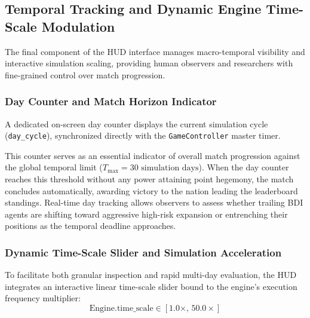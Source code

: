 \subsection{Temporal Tracking and Dynamic Engine Time-Scale Modulation}
\label{subsec:hud_time_controls}

The final component of the HUD interface manages macro-temporal visibility and interactive simulation scaling, providing human observers and researchers with fine-grained control over match progression.

\subsubsection{Day Counter and Match Horizon Indicator}
A dedicated on-screen day counter displays the current simulation cycle (\texttt{day\_cycle}), synchronized directly with the \texttt{GameController} master timer. 

This counter serves as an essential indicator of overall match progression against the global temporal limit ($T_{\text{max}} = 30\text{ simulation days}$). When the day counter reaches this threshold without any power attaining point hegemony, the match concludes automatically, awarding victory to the nation leading the leaderboard standings. Real-time day tracking allows observers to assess whether trailing BDI agents are shifting toward aggressive high-risk expansion or entrenching their positions as the temporal deadline approaches.

\subsubsection{Dynamic Time-Scale Slider and Simulation Acceleration}
To facilitate both granular inspection and rapid multi-day evaluation, the HUD integrates an interactive linear time-scale slider bound to the engine's execution frequency multiplier:
\begin{equation}
    \text{Engine.time\_scale} \in [1.0\times, \, 50.0\times]
\end{equation}

